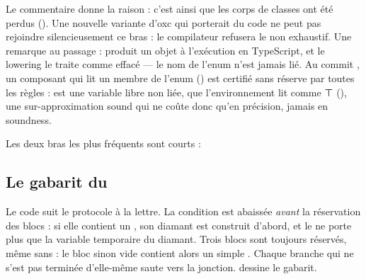 
Le commentaire donne la raison : c'est ainsi que les corps de classes ont été perdus (). Une nouvelle variante d'oxc qui porterait du code ne peut pas rejoindre silencieusement ce bras : le compilateur refusera le  non exhaustif. Une remarque au passage :  produit un objet à l'exécution en TypeScript, et le lowering le traite comme effacé --- le nom de l'enum n'est jamais lié. Au commit \snapshotCommit{}, un composant qui lit un membre de l'enum () est certifié sans réserve par toutes les règles :  est une variable libre non liée, que l'environnement lit comme ⊤ (), une sur-approximation sound qui ne coûte donc qu'en précision, jamais en soundness.

Les deux bras les plus fréquents sont courts :


\subsection{Le gabarit du }


Le code suit le protocole à la lettre. La condition est abaissée \emph{avant} la réservation des blocs : si elle contient un \code{&&}, son diamant est construit d'abord, et le  ne porte plus que la variable temporaire du diamant. Trois blocs sont toujours réservés, même sans  : le bloc \og sinon\fg{} vide contient alors un simple . Chaque branche qui ne s'est pas terminée d'elle-même saute vers la jonction.  dessine le gabarit.

